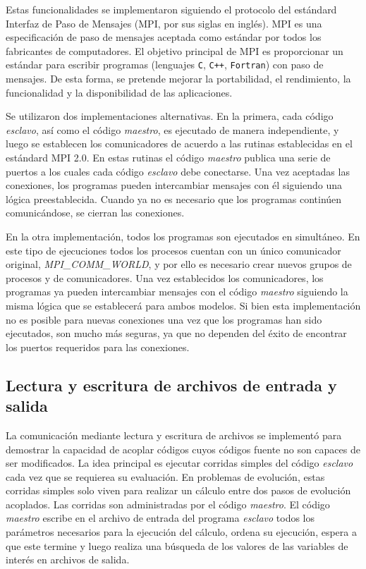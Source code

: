 Estas funcionalidades se implementaron siguiendo el protocolo del estándard Interfaz de Paso de Mensajes (MPI, por sus siglas en inglés). 
MPI es una especificación de paso de mensajes aceptada como estándar
por todos los fabricantes de computadores. 
El objetivo principal de MPI es proporcionar un estándar para escribir
programas (lenguajes \texttt{C}, \texttt{C++}, \texttt{Fortran}) con paso de mensajes. De esta forma, se
pretende mejorar la portabilidad, el rendimiento, la funcionalidad y
la disponibilidad de las aplicaciones.

Se utilizaron dos implementaciones alternativas.
En la primera, cada código \textit{esclavo}, así como el código \textit{maestro}, es ejecutado de manera independiente,
y luego se establecen los comunicadores de acuerdo a las rutinas establecidas en el estándard MPI 2.0.
En estas rutinas el código \textit{maestro} publica una serie de puertos a los cuales cada código \textit{esclavo} debe conectarse.
Una vez aceptadas las conexiones, los programas pueden intercambiar mensajes con él siguiendo una lógica preestablecida.
Cuando ya no es necesario que los programas continúen comunicándose, se cierran las conexiones.

En la otra implementación, todos los programas son ejecutados en simultáneo.
En este tipo de ejecuciones todos los procesos cuentan con un único comunicador original, \textit{MPI\_COMM\_WORLD}, y por ello es necesario crear nuevos grupos de procesos y de comunicadores.
Una vez establecidos los comunicadores, los programas ya pueden intercambiar mensajes con el código \textit{maestro} siguiendo la misma lógica que se establecerá para ambos modelos.
Si bien esta implementación no es posible para nuevas conexiones una vez que los programas han sido ejecutados,
son mucho más seguras, ya que no dependen del éxito de encontrar los puertos requeridos para las conexiones.

\subsection*{Lectura y escritura de archivos de entrada y salida}
\label{2:io}

La comunicación mediante lectura y escritura de archivos se implementó para demostrar la capacidad de acoplar códigos cuyos códigos fuente no son capaces de ser modificados.
La idea principal es ejecutar corridas simples del código \textit{esclavo} cada vez que se requierea su evaluación.
En problemas de evolución, estas corridas simples solo viven para realizar un cálculo entre dos pasos de evolución acoplados.
Las corridas son administradas por el código \textit{maestro}.
El código \textit{maestro} escribe en el archivo de entrada del programa \textit{esclavo} todos los parámetros necesarios para la ejecución del cálculo,
ordena su ejecución, espera a que este termine y luego realiza una búsqueda de los valores de las variables de interés en archivos de salida.

